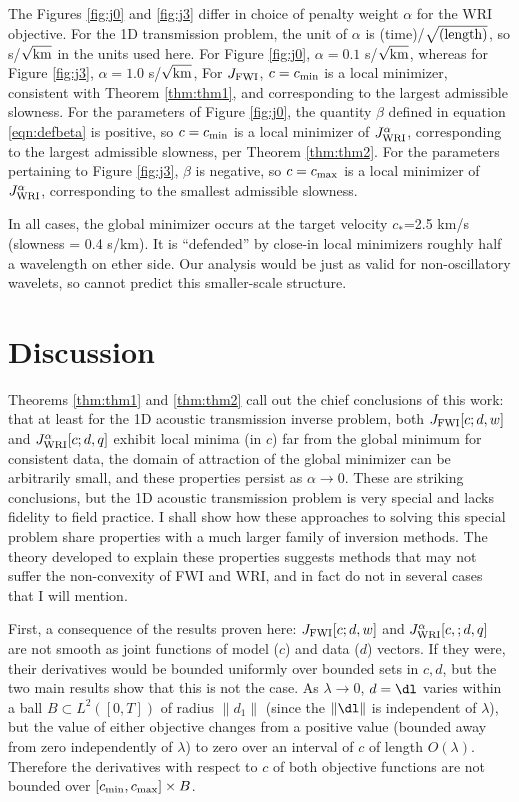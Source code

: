 The Figures \ref{fig:j0} and \ref{fig:j3} differ in choice of penalty
weight $\alpha$ for the WRI objective. For the 1D transmission
problem, the unit of $\alpha$ is (time)/$\sqrt{\rm (length)}$, so
s/$\sqrt{\rm km}$ in the units used here. For Figure \ref{fig:j0},
$\alpha = 0.1$ s/$\sqrt{\rm km}$, whereas for Figure \ref{fig:j3},
$\alpha = 1.0$ s/$\sqrt{\rm km}$, For $J_{\rm FWI}$, $c=c_{\rm min}$
is a local minimizer, consistent with Theorem \ref{thm:thm1}, and corresponding to the largest admissible slowness.
For the parameters
of Figure \ref{fig:j0}, the quantity $\beta$ defined in equation
\ref{eqn:defbeta} is positive, so $c=c_{\rm min}$ is a local minimizer
of $J_{\rm WRI}^{\alpha}$, corresponding to the largest admissible slowness, per Theorem \ref{thm:thm2}. For
the parameters pertaining to Figure \ref{fig:j3}, $\beta$ is
negative, so $c=c_{\rm max}$ is a local minimizer of $J_{\rm
  WRI}^{\alpha}$, corresponding to the smallest admissible slowness.

In all cases, the global minimizer occurs at the target velocity
$c_*$=2.5 km/s (slowness = 0.4 s/km). It is ``defended'' by close-in
local minimizers roughly half a wavelength on ether side. Our analysis
would be just as valid for non-oscillatory wavelets, so cannot predict
this smaller-scale structure.


%

\section{Discussion}
Theorems \ref{thm:thm1} and \ref{thm:thm2} call out the chief
conclusions of this work: that at least for the 1D acoustic
transmission inverse problem, both $J_{\rm FWI}[c;d,w]$ and
$J_{\rm WRI}^{\alpha}[c;d,q]$ exhibit local minima (in $c$) far from the global
minimum for consistent data, the domain of attraction of the
global minimizer can be arbitrarily small, and these properties
persist as $\alpha \rightarrow 0$. These are striking
conclusions, but the 1D acoustic transmission problem is very special
and lacks fidelity to field practice. I shall show how these
approaches to solving this special problem share properties with a
much larger family of inversion methods. The theory developed to
explain these properties suggests methods that may not suffer the
non-convexity of FWI and WRI, and in fact do not in several cases that
I will mention. 

First, a consequence of the results proven here: $J_{\rm FWI}[c;d,w]$
and $J_{\rm WRI}^{\alpha}[c,;d,q]$ are not smooth as joint functions of model
($c$) and data ($d$) vectors. If they were, their derivatives would be
bounded uniformly over bounded sets in $c,d$, but the two main results
show that this is not the case. As $\lambda \rightarrow 0$, $d=\dl$
varies within a ball $B \subset L^2([0,T])$ of radius $\|d_1\|$ (since
the $\|\dl\|$ is independent of $\lambda$), but the value of either
objective changes from a positive value (bounded away from zero
independently of $\lambda$) to zero over an interval of $c$ of length
$O(\lambda)$. Therefore the derivatives with respect to $c$ of both
objective functions are not bounded over
$[c_{\rm min},c_{\rm max}] \times B$.

